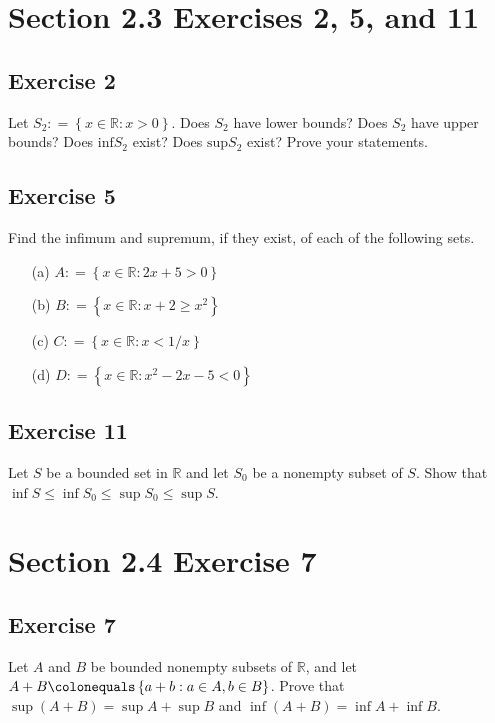 \documentclass[12pt]{article}
\begin{document}
\section*{Section 2.3 Exercises 2, 5, and 11}

\subsection*{Exercise 2}
Let $S_2 \mathrel{\mathop:}= \left\{x \in \mathbb{R} : x > 0\right\}$. Does $S_2$ have lower bounds? Does $S_2$ have upper bounds? Does $\text{inf}S_2$ exist? Does $\text{sup}S_2$ exist? Prove your statements.

\subsection*{Exercise 5}
Find the infimum and supremum, if they exist, of each of the following sets.
\begin{itemize}
\item[(a)] $A \mathrel{\mathop:}= \left\{x \in \mathbb{R} : 2x + 5 > 0\right\}$
\item[(b)] $B \mathrel{\mathop:}= \left\{x \in \mathbb{R} : x + 2 \geq x^2\right\}$
\item[(c)] $C \mathrel{\mathop:}= \left\{x \in \mathbb{R} : x < 1/x\right\}$
\item[(d)] $D \mathrel{\mathop:}= \left\{x \in \mathbb{R} : x^2 - 2x - 5 < 0\right\}$
\end{itemize}

\subsection*{Exercise 11}
Let $S$ be a bounded set in $\mathbb{R}$ and let $S_0$ be a nonempty subset of $S$. Show that $\inf S \leq \inf S_0 \leq \sup S_0 \leq \sup S$.

\section*{Section 2.4 Exercise 7}

\subsection*{Exercise 7}

Let $A$ and $B$ be bounded nonempty subsets of $\mathbb{R}$, and let $A + B \colonequals \left\{a + b : a \in A, b \in B\right\}$. Prove that $\sup\left(A + B\right) = \sup A + \sup B$ and $\inf \left(A + B\right) = \inf A + \inf B$.
\end{document}
